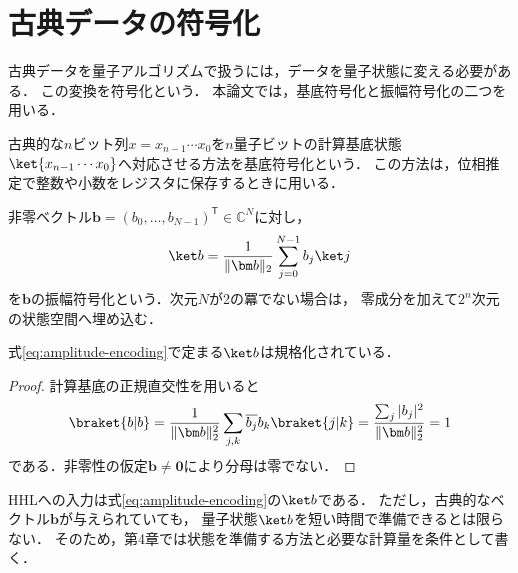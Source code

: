 \section{古典データの符号化}
\label{sec:data-encoding}

古典データを量子アルゴリズムで扱うには，データを量子状態に変える必要がある．
この変換を符号化という．
本論文では，基底符号化と振幅符号化の二つを用いる．

古典的な$n$ビット列$x=x_{n-1}\cdots x_0$を$n$量子ビットの計算基底状態
$\ket{x_{n-1}\cdots x_0}$へ対応させる方法を基底符号化という．
この方法は，位相推定で整数や小数をレジスタに保存するときに用いる．

\begin{defi}[振幅符号化]
非零ベクトル$\bm b=(b_0,\ldots,b_{N-1})^{\mathsf T}\in\mathbb C^N$に対し，
\begin{equation}
 \ket b=\frac1{\lVert\bm b\rVert_2}
          \sum_{j=0}^{N-1}b_j\ket j
 \label{eq:amplitude-encoding}
\end{equation}
を$\bm b$の振幅符号化という．次元$N$が2の冪でない場合は，
零成分を加えて$2^n$次元の状態空間へ埋め込む．
\end{defi}

\begin{prop}
式\eqref{eq:amplitude-encoding}で定まる$\ket b$は規格化されている．
\end{prop}
\begin{proof}
計算基底の正規直交性を用いると
\[
 \braket{b|b}
 =\frac1{\lVert\bm b\rVert_2^2}
   \sum_{j,k}\overline{b_j}b_k\braket{j|k}
 =\frac{\sum_j|b_j|^2}{\lVert\bm b\rVert_2^2}=1
\]
である．非零性の仮定$\bm b\ne\bm0$により分母は零でない．
\end{proof}

HHLへの入力は式\eqref{eq:amplitude-encoding}の$\ket b$である．
ただし，古典的なベクトル$\bm b$が与えられていても，
量子状態$\ket b$を短い時間で準備できるとは限らない．
そのため，第4章では状態を準備する方法と必要な計算量を条件として書く．
